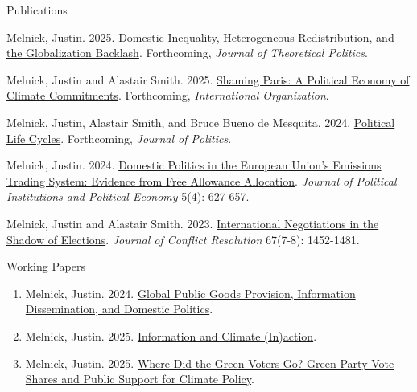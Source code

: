 \documentclass{resume} %
\begin{document}
\begin{rSection}{Publications}

\begin{etaremune}
            \item Melnick, Justin. 2025. \href{https://justinmelnick.github.io/papers/exit/paper.pdf}{Domestic Inequality, Heterogeneous Redistribution, and the Globalization Backlash}. Forthcoming, \textit{Journal of Theoretical Politics}.
           \item Melnick, Justin and Alastair Smith. 2025. \href{https://justinmelnick.github.io/papers/paris/paper.pdf}{Shaming Paris: A Political Economy of Climate Commitments}. Forthcoming, \textit{International Organization}.
 \item Melnick, Justin, Alastair Smith, and Bruce Bueno de Mesquita. 2024. \href{https://justinmelnick.github.io/papers/plc/paper.pdf}{Political Life Cycles}. Forthcoming, \textit{Journal of Politics}.
\item Melnick, Justin. 2024. \href{https://justinmelnick.github.io/papers/ets/paper.pdf}{Domestic Politics in the European Union’s Emissions Trading System: Evidence from Free Allowance Allocation}. \textit{Journal of Political Institutions and Political Economy} 5(4): 627-657.
    \item Melnick, Justin and Alastair Smith. 2023. \href{https://justinmelnick.github.io/papers/nego/paper.pdf}{International Negotiations in the Shadow of Elections}.  \textit{Journal of Conflict Resolution} 67(7-8): 1452-1481.
\end{etaremune}

\end{rSection}

\begin{rSection}{Working Papers}

\begin{enumerate}
                \item Melnick, Justin. 2024. \href{https://justinmelnick.github.io/papers/mechdesign/paper.pdf}{Global Public Goods Provision, Information Dissemination, and Domestic Politics}.
                    \item Melnick, Justin. 2025. \href{https://justinmelnick.github.io/papers/inaction/paper.pdf}{Information and Climate (In)action}.
                        \item Melnick, Justin. 2025. \href{https://justinmelnick.github.io/papers/greens/paper.pdf}{Where Did the Green Voters Go? Green Party Vote Shares and Public Support for Climate Policy}.
\end{enumerate}

\end{rSection}
\end{document}
